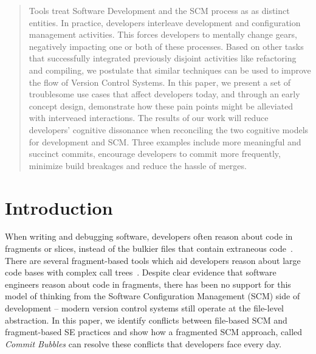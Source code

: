 \documentclass[conference]{IEEEtran}
\begin{document}
\begin{abstract}



Tools treat Software Development and the SCM process as as distinct entities.
In practice, developers interleave development and configuration management activities.
This forces developers to mentally change gears, negatively impacting one or both of these
processes.
Based on other tasks that successfully integrated previously disjoint activities like refactoring
and compiling, we postulate that similar techniques can be used to improve the flow of Version Control Systems.
In this paper, we present a set of troublesome use cases that affect developers today, and through an early concept design, demonstrate how these pain points might be alleviated with interveaed interactions.
The results of our work will reduce developers' cognitive dissonance when reconciling the two cognitive models for development and SCM. 
Three examples include more meaningful and succinct commits, encourage developers to commit more frequently, minimize build breakages and reduce the hassle of merges.

\end{abstract}


%
\IEEEpeerreviewmaketitle

\section{Introduction}

When writing and debugging software, developers often reason about code in fragments or slices, instead of the bulkier files that contain extraneous code~\cite{Weiser1982a}.
There are several fragment-based tools which aid developers reason about large code bases with complex call trees~\cite{Deline2012DebuggerCanvas, DeLine2010a, Bragdon2010CodeBubbles}.
Despite clear evidence that software engineers reason about code in fragments, there has been no support for this model of thinking from the Software Configuration Management (SCM) side of development -- modern version control systems still operate at the file-level abstraction.
In this paper, we identify conflicts between file-based SCM and fragment-based SE practices and show how a fragmented SCM approach, called \textit{Commit Bubbles} can resolve these conflicts that developers face every day.
\end{document}
